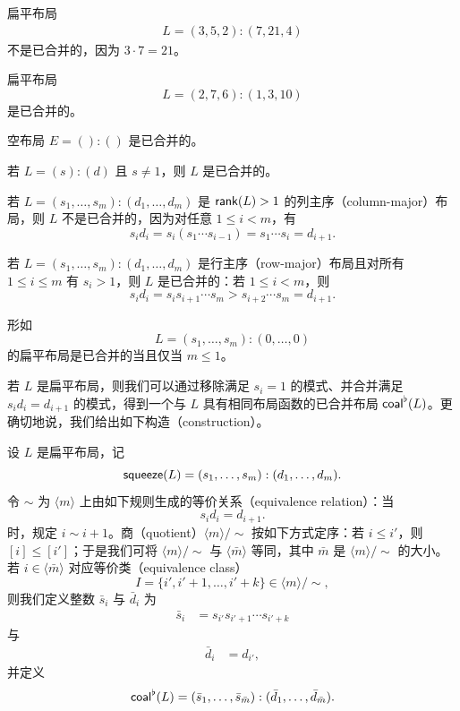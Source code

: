 \begin{example}
    扁平布局
    \begin{align*} L =(3,5,2):(7,21,4)
    \end{align*}
    不是已合并的，因为 $3\cdot 7 = 21$。
\end{example}
\begin{example}扁平布局
    \[
    L = (2,7,6):(1,3,10)
    \]
    是已合并的。
\end{example}
\begin{example}
    空布局 $E = ():()$ 是已合并的。
\end{example}
\begin{example}
    若 $L=(s):(d)$ 且 $s \neq 1$，则 $L$ 是已合并的。
\end{example}

\begin{example}
    若 $L = (s_1,\dots,s_m):(d_1,\dots,d_m)$ 是 $\mathsf{rank}(L)>1$ 的列主序（column-major）布局，则 $L$ 不是已合并的，因为对任意 $1 \leq i < m$，有
    \[
    s_id_i = s_i (s_1\cdots s_{i-1}) = s_1 \cdots s_i = d_{i+1}.
    \]
\end{example}

\begin{example}
    若 $L = (s_1,\dots,s_m):(d_1,\dots,d_m)$ 是行主序（row-major）布局且对所有 $1 \leq i \leq m$ 有 $s_i>1$，则 $L$ 是已合并的：若 $ 1\leq i < m$，则
    \[
    s_id_i = s_is_{i+1}\cdots s_m > s_{i+2}\cdots s_m = d_{i+1}.
    \]
\end{example}


\begin{example}
    形如
    \[L = (s_1,\dots,s_m):(0,\dots,0)\]
    的扁平布局是已合并的当且仅当 $m \leq 1$。
\end{example}

若 $L$ 是扁平布局，则我们可以通过移除满足 $s_i = 1$ 的模式、并合并满足 $s_id_i = d_{i+1}$ 的模式，得到一个与 $L$ 具有相同布局函数的已合并布局 $\mathsf{coal}^\flat(L)$。更确切地说，我们给出如下构造（construction）。

\begin{construction}\label{constructionofflatcoalesce}
设 $L$ 是扁平布局，记
\[\mathsf{squeeze}(L) = (s_1,\dots,s_m):(d_1,\dots,d_m).\]
令 $\sim$ 为 $\langle m \rangle$ 上由如下规则生成的等价关系（equivalence relation）：当
\[
s_id_i = d_{i+1}.
\]
时，规定 $i \sim i+1$。商（quotient）$\langle m \rangle / \sim$ 按如下方式定序：若 $i \leq i'$，则 $[i] \leq [i']$；于是我们可将 $\langle m \rangle / \sim$ 与 $\langle \bar{m} \rangle$ 等同，其中 $\bar{m}$ 是 $\langle m \rangle / \sim$ 的大小。若 $i \in \langle \bar{m} \rangle$ 对应等价类（equivalence class）
\[I = \{i', i' + 1, \dots, i'+k\} \in \langle m \rangle/\sim,\]
则我们定义整数 $\bar{s}_i$ 与 $\bar{d}_i$ 为
\begin{align*}
\bar{s}_i & = s_{i'} s_{i'+1}\cdots s_{i'+k}
\end{align*}
与
\begin{align*}
\bar{d}_i & = d_{i'},
\end{align*}
并定义
\[
\mathsf{coal}^\flat(L) = (\bar{s}_1,\dots,\bar{s}_{\bar{m}}):(\bar{d}_1,\dots,\bar{d}_{\bar{m}}).
\]
\end{construction}


